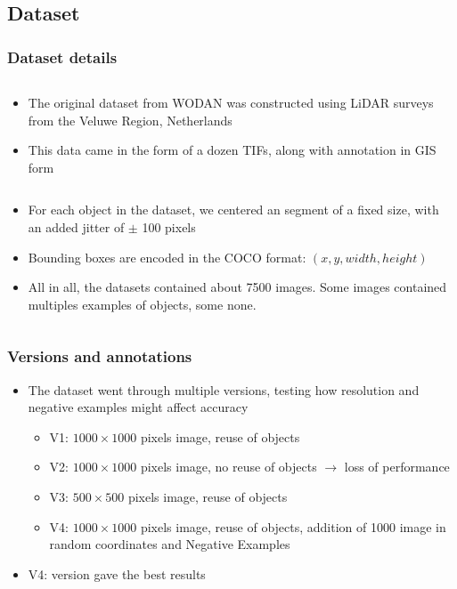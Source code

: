 \documentclass[aspectratio=169]{beamer}
\begin{document}
\subsection{Dataset}
\begin{frame}
	\frametitle{Dataset details}
		\begin{column}{.48\textwidth}
			\begin{itemize}
				\item The original dataset from WODAN was constructed using LiDAR surveys from the Veluwe Region, Netherlands
				\item This data came in the form of a dozen TIFs, along with annotation in GIS form
			\end{itemize}
		\end{column}%
		\hfill%
		\begin{column}{.48\textwidth}
			\begin{itemize}
				\item For each object in the dataset, we centered an segment of a fixed size, with an added jitter of $\pm$ 100 pixels
				\item Bounding boxes are encoded in the COCO format: $(x, y, width, height)$
				\item All in all, the datasets contained about 7500 images. Some images contained multiples examples of objects, some none.
			\end{itemize}
		\end{column}%
\end{frame}


\begin{frame}
	\frametitle{Versions and annotations}
	\begin{itemize}
		\item The dataset went through multiple versions, testing how resolution and negative examples might affect accuracy
			\begin{itemize}
				\item V1: $1000 \times 1000$ pixels image, reuse of objects 
				\item V2: $1000 \times 1000$ pixels image, no reuse of objects $\rightarrow$ loss of performance 
				\item V3: $500 \times 500$ pixels image, reuse of objects
				\item V4: $1000 \times 1000$ pixels image, reuse of objects, addition of 1000 image in random coordinates and Negative Examples
			\end{itemize}
		\item V4: version gave the best results 
	\end{itemize}
\end{frame}
\end{document}

